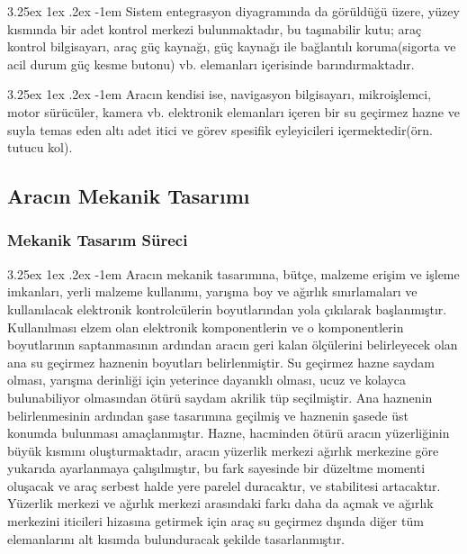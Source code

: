 \documentclass[12pt]{article}
\makeatletter
\renewcommand\paragraph{\@startsection{paragraph}{5}{\z@}%
  {3.25ex \@plus1ex \@minus.2ex}%
  {-1em}%
  {\normalfont\normalsize\bfseries}}
\makeatother
\begin{document}
\paragraph{} Sistem entegrasyon diyagramında da görüldüğü üzere, yüzey kısmında bir adet kontrol merkezi bulunmaktadır, bu taşınabilir kutu; araç kontrol bilgisayarı, araç güç kaynağı, güç kaynağı ile bağlantılı koruma(sigorta ve acil durum güç kesme butonu) vb. elemanları içerisinde barındırmaktadır. 

\paragraph{} Aracın kendisi ise, navigasyon bilgisayarı, mikroişlemci, motor sürücüler, kamera vb. elektronik elemanları içeren bir su geçirmez hazne ve suyla temas eden altı adet itici ve görev spesifik eyleyicileri içermektedir(örn. tutucu kol).


\newpage
\subsection{Aracın Mekanik Tasarımı}

\subsubsection{Mekanik Tasarım Süreci}

\paragraph{} Aracın mekanik tasarımına, bütçe, malzeme erişim  ve işleme imkanları, yerli malzeme kullanımı, yarışma boy ve ağırlık sınırlamaları ve kullanılacak elektronik kontrolcülerin boyutlarından yola çıkılarak başlanmıştır. Kullanılması elzem olan elektronik komponentlerin ve o komponentlerin boyutlarının saptanmasının ardından aracın geri kalan ölçülerini belirleyecek olan ana su geçirmez haznenin boyutları belirlenmiştir. Su geçirmez hazne saydam olması, yarışma derinliği için yeterince dayanıklı olması, ucuz ve kolayca bulunabiliyor olmasından ötürü saydam akrilik tüp seçilmiştir. Ana haznenin belirlenmesinin ardından şase tasarımına geçilmiş ve haznenin şasede üst konumda bulunması amaçlanmıştır. Hazne, hacminden ötürü aracın yüzerliğinin büyük kısmını oluşturmaktadır, aracın yüzerlik merkezi ağırlık merkezine göre yukarıda ayarlanmaya çalışılmıştır, bu fark sayesinde bir düzeltme momenti oluşacak ve araç serbest halde yere parelel duracaktır, ve stabilitesi artacaktır.\cite{BOOK:rovmanual} Yüzerlik merkezi ve ağırlık merkezi arasındaki farkı daha da açmak ve ağırlık merkezini iticileri hizasına getirmek için araç su geçirmez dışında diğer tüm elemanlarını alt kısımda bulunduracak şekilde tasarlanmıştır.
\end{document}
